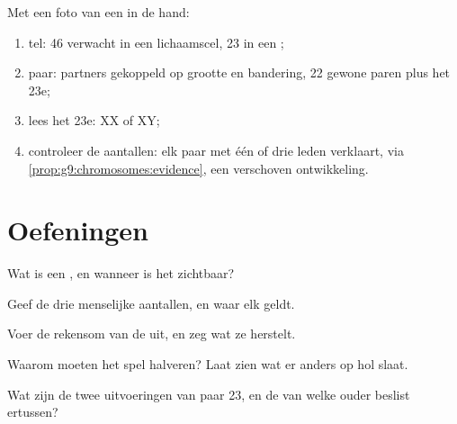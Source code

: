 \begin{method}\label{met:g9:chromosomes:read}
Met een foto van een  in de hand:
\begin{enumerate}
  \item tel: 46 verwacht in een lichaamscel, 23 in een
        ;
  \item paar: partners gekoppeld op grootte en bandering, 22
        gewone paren plus het 23e;
  \item lees het 23e: XX of XY;
  \item controleer de aantallen: elk paar met één of drie leden
        verklaart, via
        \cref{prop:g9:chromosomes:evidence}, een verschoven
        ontwikkeling.
\end{enumerate}
\end{method}

\section{Oefeningen}

\begin{exercise}[$\star$]\label{exo:g9:chromosomes:1}
Wat is een , en wanneer is het zichtbaar?
\end{exercise}

\begin{exercise}[$\star$]\label{exo:g9:chromosomes:2}
Geef de drie menselijke aantallen, en waar elk geldt.
\end{exercise}

\begin{exercise}[$\star$]\label{exo:g9:chromosomes:3}
Voer de rekensom van de  uit, en zeg wat ze
herstelt.
\end{exercise}

\begin{exercise}[$\star$]\label{exo:g9:chromosomes:4}
Waarom moeten  het spel halveren? Laat zien wat
er anders op hol slaat.
\end{exercise}

\begin{exercise}[$\star$]\label{exo:g9:chromosomes:5}
Wat zijn de twee uitvoeringen van paar 23, en de 
van welke ouder beslist ertussen?
\end{exercise}

